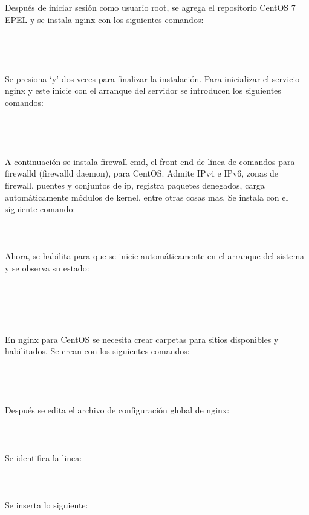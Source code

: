 Después de iniciar sesión como usuario root, se agrega el repositorio CentOS 7 EPEL y se instala nginx con los siguientes comandos:\\
\\
\\
\\
\\
Se presiona ‘y’ dos veces para finalizar la instalación. Para inicializar el servicio nginx y este inicie con el arranque del servidor se introducen los siguientes comandos:\\
\\
\\
\\
\\
A continuación se instala firewall-cmd, el front-end de línea de comandos para firewalld (firewalld daemon), para CentOS. Admite IPv4 e IPv6, zonas de firewall, puentes y conjuntos de ip, registra paquetes denegados, carga automáticamente módulos de kernel, entre otras cosas mas. Se instala con el siguiente comando:\\
\\
\\
\\
Ahora, se habilita para que se inicie automáticamente en el arranque del sistema y se observa su estado:\\
\\
\\
\\
\\
\\
En nginx para CentOS se necesita crear carpetas para sitios disponibles y habilitados. Se crean con los siguientes comandos:\\
\\
\\
\\
\\
Después se edita el archivo de configuración global de nginx:\\
\\
\\
\\
Se identifica la linea:\\
\\
\\
\\
Se inserta lo siguiente:\\
\\
\\
\vspace{0.8cm}

